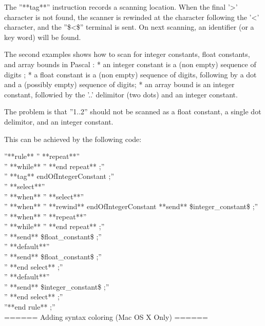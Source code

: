 The ''**tag**'' instruction records a scanning location. When the final '>' character is not found, the scanner is rewinded at the character following the '<' character, and the ''\$<\$'' terminal is sent. On next scanning, an identifier (or a key word) will be found.

The second examples shows how to scan for integer constants, float constants, and array bounds in Pascal :
  * an integer constant is a (non empty) sequence of digits ;
  * a float constant is a (non empty) sequence of digits, following by a dot and a (possibly empty) sequence of digits;
  * an array bound is an integer constant, followied by the '..' delimitor (two dots) and an integer constant.

The problem is that ''1..2'' should not be scanned as a float constant, a single dot delimitor, and an integer constant.

This can be achieved by the following code:

''**rule** %
'' **repeat**''\\
'' **while** %
'' **end repeat** ;''\\
'' **tag** endOfIntegerConstant ;''\\
'' **select**''\\
'' **when** %
''  **select**''\\
''  **when** %
''   **rewind** endOfIntegerConstant **send** \$integer\_constant\$ ;''\\
''  **when** %
''   **repeat**''\\
''   **while** %
''   **end repeat** ;''\\
''   **send** \$float\_constant\$ ;''\\
''  **default**''\\
''   **send** \$float\_constant\$ ;''\\
''  **end select** ;''\\
'' **default**''\\
''  **send** \$integer\_constant\$ ;''\\
'' **end select** ;''\\
''**end rule** ;''\\


====== Adding syntax coloring (Mac OS X Only) ======

